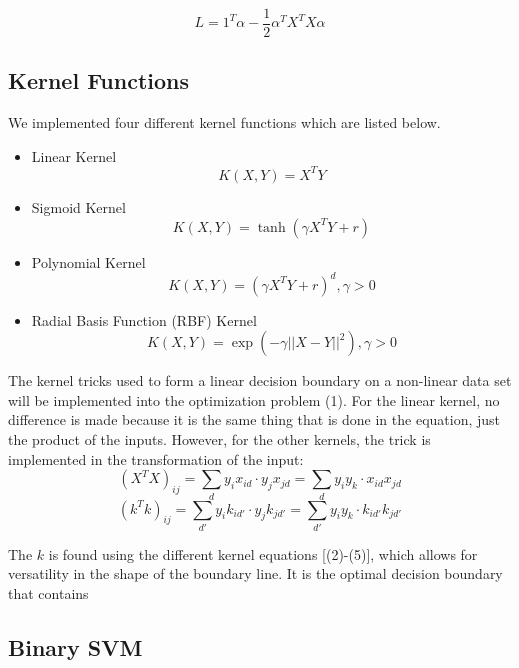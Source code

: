 \documentclass[12pt]{article}
\begin{document}
\begin{equation}
    L = 1^T \alpha - \frac{1}{2}\alpha^TX^TX\alpha
\end{equation}

\subsection{Kernel Functions}
We implemented four different kernel functions which are listed below.
\begin{itemize}
    \item Linear Kernel
    \begin{equation}
    K(X, Y) = X^T Y
    \end{equation}
    
    \item Sigmoid Kernel
    \begin{equation}
    K(X, Y) = \tanh(\gamma X^T Y + r)
    \end{equation}
    
    \item Polynomial Kernel
    \begin{equation}
    K(X, Y) = (\gamma X^T Y + r)^d, \gamma > 0
    \end{equation}
    
    \item Radial Basis Function (RBF) Kernel
    \begin{equation}
    K(X, Y) = \exp(-\gamma ||X - Y||^2), \gamma > 0
    \end{equation}
\end{itemize}

The kernel tricks used to form a linear decision boundary on a non-linear data set will be implemented into the optimization problem (1). For the linear kernel, no difference is made because it is the same thing that is done in the equation, just the product of the inputs. However, for the other kernels, the trick is implemented in the transformation of the input:
$$(X^TX)_{ij} = \sum_{d} y_i x_{id} \cdot y_j x_{jd} = \sum_{d} y_i y_k \cdot x_{id} x_{jd}$$
$$(k^Tk)_{ij} = \sum_{d'} y_i k_{id'} \cdot y_j k_{jd'} = \sum_{d'} y_i y_k \cdot k_{id'} k_{jd'}$$

The $k$ is found using the different kernel equations [(2)-(5)], which allows for versatility in the shape of the boundary line. It is the optimal decision boundary that contains 

\subsection{Binary SVM}
\end{document}
